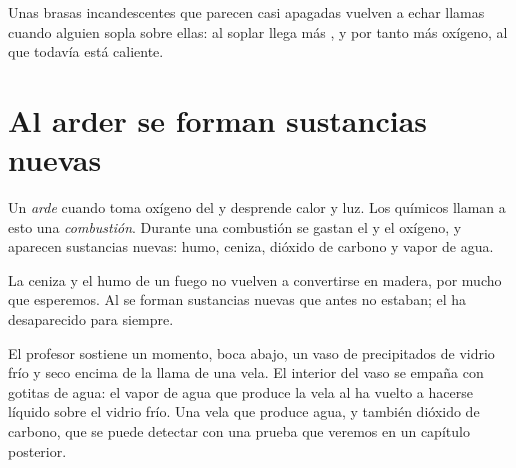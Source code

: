 \begin{example}\label{ex:g4:what-a-fire-needs:embers}
Unas brasas incandescentes que parecen casi apagadas vuelven a echar
llamas cuando alguien sopla sobre ellas: al soplar llega más , y por
tanto más oxígeno, al  que todavía está caliente.
\end{example}

\section{Al arder se forman sustancias nuevas}

\begin{definition}\label{def:g4:what-a-fire-needs:burning}
Un  \emph{arde} cuando toma oxígeno del  y
desprende calor y luz. Los químicos llaman a esto una
\emph{combustión}. Durante una combustión se gastan el
 y el oxígeno, y aparecen sustancias nuevas: humo, ceniza,
dióxido de carbono y vapor de agua.
\end{definition}

\begin{proposition}\label{prop:g4:what-a-fire-needs:new}
La ceniza y el humo de un fuego no vuelven a convertirse en madera, por
mucho que esperemos. Al  se forman sustancias nuevas que antes no
estaban; el  ha desaparecido para siempre.
\end{proposition}

\begin{inthelab}
El profesor sostiene un momento, boca abajo, un vaso de precipitados de
vidrio frío y seco encima de la llama de una vela. El interior del vaso
se empaña con gotitas de agua: el vapor de agua que produce la vela al
 ha vuelto a hacerse líquido sobre el vidrio frío. Una vela que
 produce agua, y también dióxido de carbono, que se puede detectar
con una prueba que veremos en un capítulo posterior.
\end{inthelab}

